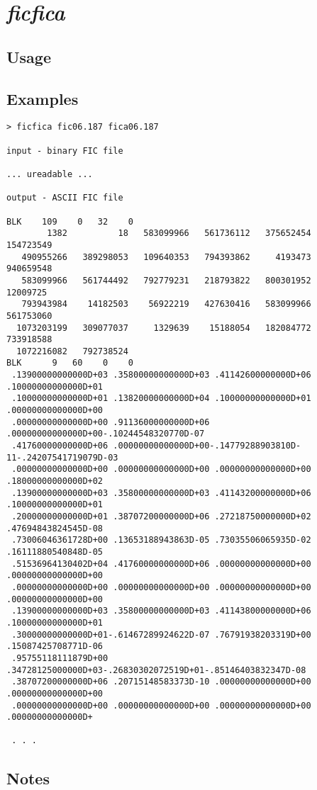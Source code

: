 \section{\emph{ficfica}}
\subsection{Usage}
\subsection{Examples}
\begin{verbatim}
> ficfica fic06.187 fica06.187

input - binary FIC file

... ureadable ...

output - ASCII FIC file

BLK    109    0   32    0
        1382          18   583099966   561736112   375652454   154723549
   490955266   389298053   109640353   794393862     4193473   940659548
   583099966   561744492   792779231   218793822   800301952    12009725
   793943984    14182503    56922219   427630416   583099966   561753060
  1073203199   309077037     1329639    15188054   182084772   733918588
  1072216082   792738524
BLK      9   60    0    0
 .13900000000000D+03 .35800000000000D+03 .41142600000000D+06 .10000000000000D+01
 .10000000000000D+01 .13820000000000D+04 .10000000000000D+01 .00000000000000D+00
 .00000000000000D+00 .91136000000000D+06 .00000000000000D+00-.10244548320770D-07
 .41760000000000D+06 .00000000000000D+00-.14779288903810D-11-.24207541719079D-03
 .00000000000000D+00 .00000000000000D+00 .00000000000000D+00 .18000000000000D+02
 .13900000000000D+03 .35800000000000D+03 .41143200000000D+06 .10000000000000D+01
 .20000000000000D+01 .38707200000000D+06 .27218750000000D+02 .47694843824545D-08
 .73006046361728D+00 .13653188943863D-05 .73035506065935D-02 .16111880540848D-05
 .51536964130402D+04 .41760000000000D+06 .00000000000000D+00 .00000000000000D+00
 .00000000000000D+00 .00000000000000D+00 .00000000000000D+00 .00000000000000D+00
 .13900000000000D+03 .35800000000000D+03 .41143800000000D+06 .10000000000000D+01
 .30000000000000D+01-.61467289924622D-07 .76791938203319D+00 .15087425708771D-06
 .95755118111879D+00 .34728125000000D+03-.26830302072519D+01-.85146403832347D-08
 .38707200000000D+06 .20715148583373D-10 .00000000000000D+00 .00000000000000D+00
 .00000000000000D+00 .00000000000000D+00 .00000000000000D+00 .00000000000000D+

 . . .

\end{verbatim}
\subsection{Notes}

